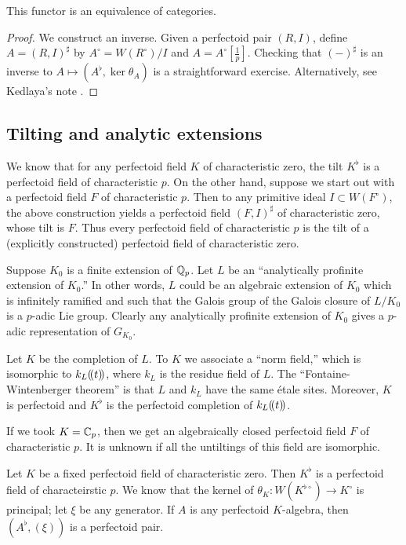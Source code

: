 \begin{theorem}
This functor is an equivalence of categories.
\end{theorem}
\begin{proof}
We construct an inverse. Given a perfectoid pair $(R,I)$, define 
$A=(R,I)^\sharp$ by $A^\circ =W(R^\circ)/I$ and $A=A^\circ[\frac 1 p]$. 
Checking that $(-)^\sharp$ is an inverse to 
$A\mapsto (A^\flat, \ker\theta_A)$ is a straightforward exercise. 
Alternatively, see Kedlaya's note \cite{ke13}. 
\end{proof}





\subsection{Tilting and analytic extensions}

We know that for any perfectoid field $K$ of characteristic zero, the tilt 
$K^\flat$ is a perfectoid field of characteristic $p$. On the other hand, 
suppose we start out with a perfectoid field $F$ of characteristic $p$. 
Then to any primitive ideal $I\subset W(F^\circ)$, the above construction 
yields a perfectoid field $(F,I)^\sharp$ of characteristic zero, whose tilt is 
$F$. Thus every perfectoid field of characteristic $p$ is the tilt of a 
(explicitly constructed) perfectoid field of characteristic zero. 

Suppose $K_0$ is a finite extension of $\mathbb{Q}_p$. Let $L$ be an ``analytically 
profinite extension of $K_0$.'' In other words, $L$ could be an algebraic extension 
of $K_0$ which is infinitely ramified and such that the Galois group of the Galois 
closure of $L/K_0$ is a $p$-adic Lie group. Clearly any analytically profinite 
extension of $K_0$ gives a $p$-adic representation of $G_{K_0}$. 

Let $K$ be the completion of $L$. To $K$ we associate a ``norm field,'' which is 
isomorphic to $k_L(\!( {t} )\!)$, where $k_L$ is the residue field of $L$. The 
``Fontaine-Wintenberger theorem'' is that $L$ and $k_L$ have the same 
\'etale sites. Moreover, $K$ is perfectoid and 
$K^\flat$ is the perfectoid completion of $k_L(\!( {t} )\!)$. 

If we took $K=\mathbb{C}_p$, then we get an algebraically closed perfectoid field 
$F$ of characteristic $p$. It is unknown if all the untiltings of this field 
are isomorphic. 

Let $K$ be a fixed perfectoid field of characteristic zero. Then $K^\flat$ is a 
perfectoid field of characteirstic $p$. We know that the kernel of  
$\theta_K:W(K^{\flat\circ}) \to K^\circ$ is principal; let $\xi$ be any 
generator. If $A$ is any perfectoid $K$-algebra, then 
$(A^\flat,(\xi))$ is a perfectoid pair. 





